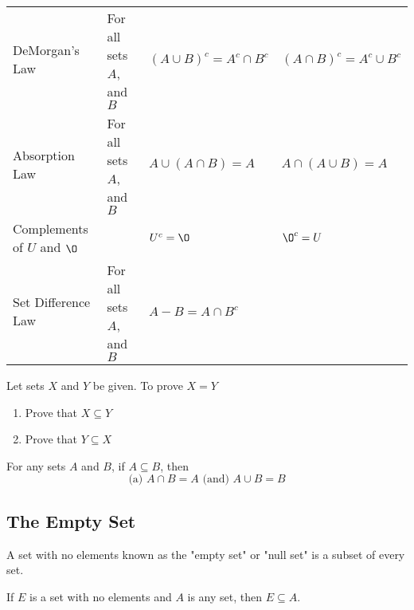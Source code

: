 \documentclass[11pt]{article}
\begin{document}
\begin{table}[!htbp]
\begin{adjustwidth}{-1.5cm}{-1.5cm}
{\begin{tabular}{ *{4}{l} }
            DeMorgan's Law          & For all sets $A$, and $B$
                                    & $(A \cup B)^c = A^c \cap B^c$
                                    & $(A \cap B)^c = A^c \cup B^c$ \\
            Absorption Law          & For all sets $A$, and $B$
                                    & $A \cup (A \cap B) = A$
                                    & $A \cap (A \cup B) = A$ \\
            Complements of
                $U$ and $\O$        &
                                    & $U^c = \O$
                                    & $\O^c = U$ \\
                Set Difference Law  & For all sets $A$, and $B$
                                    & $A - B = A \cap B^c$
                                    & \\
            \bottomrule
        \end{tabular}
        \label{tab:tbl-set-identities}
        }
        \end{adjustwidth}
    \end{table}

\begin{definition}\label{def:prove-set-eq}
    Let sets $X$ and $Y$ be given. To prove $X = Y$
    \begin{enumerate}
        \item Prove that $X \subseteq Y$
        \item Prove that $Y \subseteq X$
    \end{enumerate}
\end{definition}

\begin{definition}\label{def:intersect-union-subset}
    For any sets $A$ and $B$, if $A \subseteq B$, then
    \begin{equation*}
        \text{(a) } A \cap B = A \text{ (and) } A \cup B = B
    \end{equation*}
\end{definition}

\subsection{The Empty Set}

\begin{definition}\label{def:empty-set-thm}
    A set with no elements known as the "empty set" or "null set" is a subset of every set.

    If $E$ is a set with no elements and $A$ is any set, then $E \subseteq A$.
\end{definition}
\end{document}
